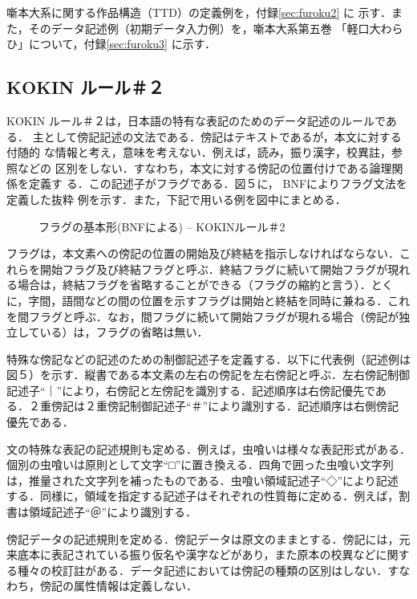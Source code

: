 噺本大系に関する作品構造（TTD）の定義例を，付録\ref{sec:furoku2} に
示す．また，そのデータ記述例（初期データ入力例）を，噺本大系第五巻
「軽口大わらひ」について，付録\ref{sec:furoku3} に示す．

\subsection{KOKIN ルール＃２}
\label{sec:4.3setu}

KOKIN ルール＃２は，日本語の特有な表記のためのデータ記述のルールである．
主として傍記記述の文法である．傍記はテキストであるが，本文に対する付随的
な情報と考え，意味を考えない．例えば，読み，振り漢字，校異註，参照などの
区別をしない．すなわち，本文に対する傍記の位置付けである論理関係を定義す
る．この記述子がフラグである．図５に， BNFによりフラグ文法を定義した抜粋
例を示す．また，下記で用いる例を図中にまとめる．

\begin{figure}[htbp]
  \begin{center}
    \leavevmode
{}
\vspace*{5mm}

    \caption{フラグの基本形(BNFによる) -- KOKINルール＃2}
    \label{fig:5}
  \end{center}
\end{figure}

フラグは，本文素への傍記の位置の開始及び終結を指示しなければならない．こ
れらを開始フラグ及び終結フラグと呼ぶ．終結フラグに続いて開始フラグが現れ
る場合は，終結フラグを省略することができる（フラグの縮約と言う）．とく
に，字間，語間などの間の位置を示すフラグは開始と終結を同時に兼ねる．これ
を間フラグと呼ぶ．なお，間フラグに続いて開始フラグが現れる場合（傍記が独
立している）は，フラグの省略は無い．

特殊な傍記などの記述のための制御記述子を定義する．以下に代表例（記述例は
図５）を示す．縦書である本文素の左右の傍記を左右傍記と呼ぶ．左右傍記制御
記述子“｜”により，右傍記と左傍記を識別する．記述順序は右傍記優先であ
る．２重傍記は２重傍記制御記述子“＃”により識別する．記述順序は右側傍記
優先である．

文の特殊な表記の記述規則も定める．例えば，虫喰いは様々な表記形式がある．
個別の虫喰いは原則として文字“□”に置き換える．四角で囲った虫喰い文字列
は，推量された文字列を補ったものである．虫喰い領域記述子“◇”により記述
する．同様に，領域を指定する記述子はそれぞれの性質毎に定める．例えば，割
書は領域記述子“＠”により識別する．

傍記データの記述規則を定める．傍記データは原文のままとする．傍記には，元
来底本に表記されている振り仮名や漢字などがあり，また原本の校異などに関す
る種々の校訂註がある．データ記述においては傍記の種類の区別はしない．すな
わち，傍記の属性情報は定義しない．

